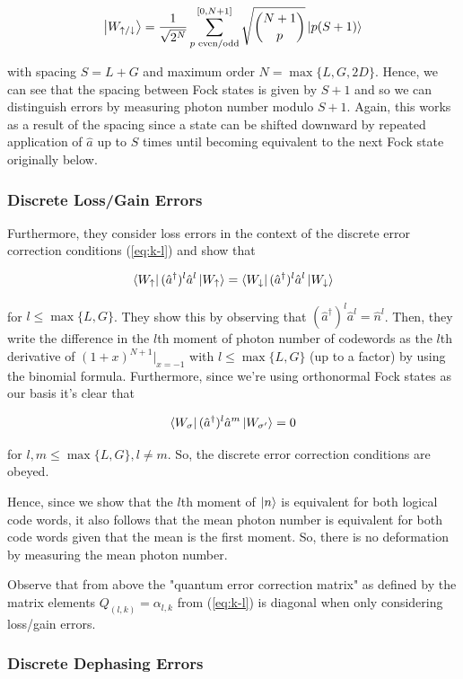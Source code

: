 \documentclass[12]{amsart}
\newcommand\0{\mathbf{0}}
\newcommand\<{\langle}
\renewcommand\>{\rangle}
\begin{document}
$$
\ket{W_{\uparrow / \downarrow}} = \frac{1}{\sqrt{2^N}} \sum_{ p\text{ even/odd}}^{[0, N+1]} \sqrt{\binom{N+1}{ p }} \ket{p(S+1)}
$$

with spacing $S = L+G$ and maximum order $N = \max\{L, G, 2D\}$. Hence, we can see that the spacing between Fock states is given by $S+1$ and so we can distinguish errors by measuring photon number modulo $S+1$. Again, this works as a result of the spacing since a state can be shifted downward by repeated application of $\hat{a}$ up to $S$ times until becoming equivalent to the next Fock state originally below.

\subsubsection{Discrete Loss/Gain Errors}

 Furthermore, they consider loss errors in the context of the discrete error correction conditions (\ref{eq:k-l}) and show that

$$
\bra{W_\uparrow}(\hat{a}^\dag)^l\hat{a}^l \ket{W_{\uparrow}} = \bra{W_\downarrow}(\hat{a}^\dag)^l\hat{a}^l \ket{W_{\downarrow}}
$$ 

for $l \leq \max\{L, G\}$. They show this by observing that $(\hat{a}^\dag)^l\hat{a}^l = \hat{n}^l$. Then, they write the difference in the $l$th moment of photon number of codewords as the $l$th derivative of $(1+x)^{N+1}\vert_{x=-1}$ with $l \leq \max\{L, G\}$ (up to a factor) by using the binomial formula. Furthermore, since we're using orthonormal Fock states as our basis it's clear that

$$
\bra{W_\sigma}(\hat{a}^\dag)^l\hat{a}^m \ket{W_{\sigma'}} = 0
$$  

for $l, m \leq \max\{L, G\}, l \neq m$. So, the discrete error correction conditions are obeyed.

Hence, since we show that the $l$th moment of $\ket{n}$ is equivalent for both logical code words, it also follows that the mean photon number is equivalent for both code words given that the mean is the first moment. So, there is no deformation by measuring the mean photon number.

Observe that from above the "quantum error correction matrix" as defined by the matrix elements $Q_{(l, k)} = \alpha_{l, k}$ from (\ref{eq:k-l}) is diagonal when only considering loss/gain errors.

\subsubsection{Discrete Dephasing Errors}
\end{document}
